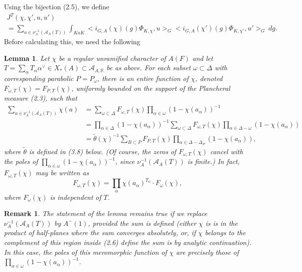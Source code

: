 \documentclass[12pt]{article}
\newtheorem{lemma}{Lemma}[section]
\newtheorem{remark}{Remark}
\begin{document}
Using the bijection (2.5), we define
\begin{equation}\tag{3.4}
\begin{array}{c}
J^T(\chi,\chi',u,u')\\
=\sum_{a\in\nu_A^{-1}(\mathcal{A}_A(T))}\int_{KaK}<i_{G,A}(\chi)(g)\Phi_{K,\chi},u>_G<i_{G,A}(\chi')(g)\Phi_{K,\chi'},u'>_G\ dg.
\end{array}
\end{equation}
Before calculating this, we need the following

\begin{lemma}
Let $\chi$ be a regular unramified character of $A(F)$ and let $T=\sum_\alpha T_\alpha\alpha^\vee\in X_*(A)\subset\mathcal{A}_{A,\mathbb{R}}$ be as above. For each subset $\omega\subset\Delta$ with corresponding parabolic $P=P_\omega$, there is an entire function of $\chi$, denoted $F_{\omega,T}(\chi)=F_{P,T}(\chi)$, uniformly bounded on the support of the Plancheral measure (2.3), such that
\[
\begin{array}{rl}
\sum_{a\in\nu_A^{-1}(\mathcal{A}_A(T))}\chi(a)&=\sum_{\omega\subset\Delta}F_{\omega,T}(\chi)\prod_{\alpha\in\omega}(1-\chi(a_\alpha))^{-1}\\
&=\prod_{\alpha\in\Delta}(1-\chi(a_\alpha))^{-1}\sum_{\omega\subset\Delta}F_{\omega,T}(\chi)\prod_{\alpha\in\Delta-\omega}(1-\chi(a_\alpha))\\
&=\tilde\theta(\chi)^{-1}\sum_{B\subset P}F_{P,T}(\chi)\prod_{\alpha\in\Delta-\Delta_P}(1-\chi(a_\alpha)),
\end{array}
\]
where $\tilde\theta$ is defined in (3.8) below. (Of course, the zeros of $F_{\omega,T}(\chi)$ cancel with the poles of $\prod_{\alpha\in\omega}(1-\chi(a_\alpha))^{-1}$, since $\nu_A^{-1}(\mathcal{A}_A(T))$ is finite.) In fact, $F_{\omega,T}(\chi)$ may be written as
\[
F_{\omega,T}(\chi)=\prod_\alpha\chi(a_\alpha)^{T_\alpha}\cdot F_\omega(\chi),
\]
where $F_\omega(\chi)$ is independent of $T$.
\end{lemma}

\begin{remark}
The statement of the lemma remains true if we replace $\nu_A^{-1}(\mathcal{A}_A(T))$ by $A^-(1)$, provided the sum is defined (either $\chi$ is is in the product of half-planes where the sum converges absolutely, or, if $\chi$ belongs to the complement of this region inside (2.6) define the sum is by analytic continuation). In this case, the poles of this meromorphic function of $\chi$ are precisely those of $\prod_{\alpha\in\omega}(1-\chi(a_\alpha))^{-1}$.
\end{remark}
\end{document}
